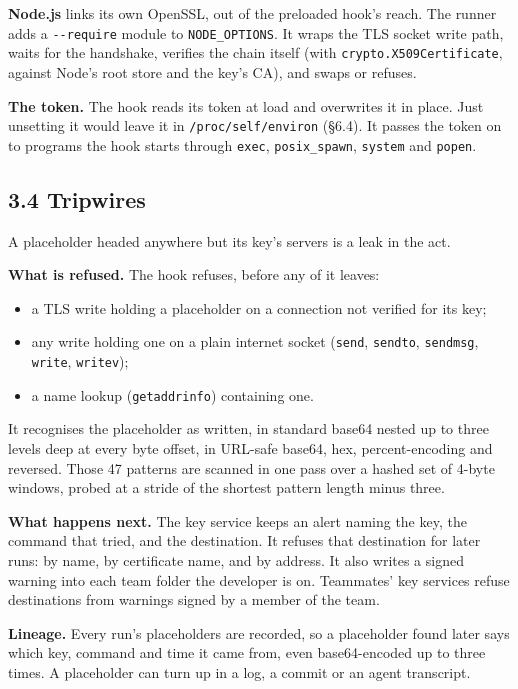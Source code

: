 \documentclass[
  11pt]{article}
\providecommand{\tightlist}{%
  \setlength{\itemsep}{0pt}\setlength{\parskip}{0pt}}
\begin{document}
\textbf{Node.js} links its own OpenSSL,
out of the preloaded hook's reach. The
runner adds a \texttt{-\/-require}
module to \texttt{NODE\_OPTIONS}. It
wraps the TLS socket write path, waits
for the handshake, verifies the chain
itself (with
\texttt{crypto.X509Certificate}, against
Node's root store and the key's CA), and
swaps or refuses.

\textbf{The token.} The hook reads its
token at load and overwrites it in
place. Just unsetting it would leave it
in \texttt{/proc/self/environ} (§6.4).
It passes the token on to programs the
hook starts through \texttt{exec},
\texttt{posix\_spawn}, \texttt{system}
and \texttt{popen}.

\subsection*{3.4
Tripwires}\label{tripwires}

A placeholder headed anywhere but its
key's servers is a leak in the act.

\textbf{What is refused.} The hook
refuses, before any of it leaves:

\begin{itemize}
\tightlist
\item
  a TLS write holding a placeholder on a
  connection not verified for its key;
\item
  any write holding one on a plain
  internet socket (\texttt{send},
  \texttt{sendto}, \texttt{sendmsg},
  \texttt{write}, \texttt{writev});
\item
  a name lookup (\texttt{getaddrinfo})
  containing one.
\end{itemize}

It recognises the placeholder as
written, in standard base64 nested up to
three levels deep at every byte offset,
in URL-safe base64, hex,
percent-encoding and reversed. Those 47
patterns are scanned in one pass over a
hashed set of 4-byte windows, probed at
a stride of the shortest pattern length
minus three.

\textbf{What happens next.} The key
service keeps an alert naming the key,
the command that tried, and the
destination. It refuses that destination
for later runs: by name, by certificate
name, and by address. It also writes a
signed warning into each team folder the
developer is on. Teammates' key services
refuse destinations from warnings signed
by a member of the team.

\textbf{Lineage.} Every run's
placeholders are recorded, so a
placeholder found later says which key,
command and time it came from, even
base64-encoded up to three times. A
placeholder can turn up in a log, a
commit or an agent transcript.
\end{document}
